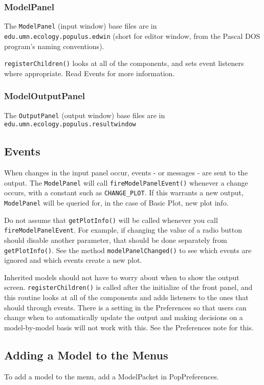 \documentclass[12pt]{article}
\begin{document}
\subsubsection{ModelPanel}
The \texttt{ModelPanel}  (input window) base files are in \texttt{edu.umn.ecology.populus.edwin}  (short for editor window, from the Pascal DOS program's naming conventions).

\texttt{registerChildren()} looks at all of the components, and sets event listeners where appropriate.  Read Events for more information.

\subsubsection{ModelOutputPanel}
The \texttt{OutputPanel}  (output window) base files are in \texttt{edu.umn.ecology.populus.resultwindow}

\subsection{Events}

When changes in the input panel occur, events - or messages - are sent to the output.
The \texttt{ModelPanel}  will call \texttt{fireModelPanelEvent()}  whenever a change occurs, with a constant such as \texttt{CHANGE\_PLOT}.  If this warrants a new output, \texttt{ModelPanel}  will be queried for, in the case of Basic Plot, new plot info.

Do not assume that \texttt{getPlotInfo()} will be called whenever you call \texttt{fireModelPanelEvent}.  For example, if changing the value of a radio button should disable another parameter, that should be done separately from \texttt{getPlotInfo()}.  See the method \texttt{modelPanelChanged()} to see which events are ignored and which events create a new plot.

Inherited models should not have to worry about when to show the output screen.  \texttt{registerChildren()} is called after the initialize of the front panel, and this routine looks at all of the components and adds listeners to the ones that should through events.  There is a setting in the Preferences so that users can change when to automatically update the output and making decisions on a model-by-model basis will not work with this.  See the Preferences note for this.

\subsection{Adding a Model to the Menus}
To add a model to the menu, add a ModelPacket in PopPreferences.
\end{document}
